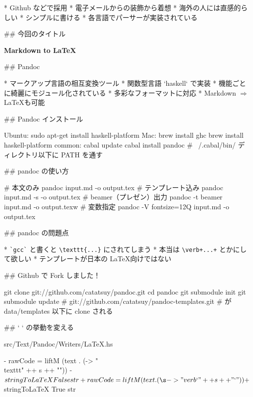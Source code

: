 * Github などで採用
* 電子メールからの装飾から着想
    * 海外の人には直感的らしい
* シンプルに書ける
* 各言語でパーサーが実装されている

## 今回のタイトル

\vspace{-25pt}
\begin{center}
 \Huge\bfseries
 Markdown to \LaTeX
\end{center}

## Pandoc

* マークアップ言語の相互変換ツール
* 関数型言語 `haskell` で実装
* 機能ごとに綺麗にモジュール化されている
* 多彩なフォーマットに対応
* Markdown $\Rightarrow$ \LaTeX も可能

## Pandoc インストール

\small

    Ubuntu:
      sudo apt-get install haskell-platform
    Mac:
      brew install ghc
      brew install haskell-platform
    common:
      cabal update
      cabal install pandoc
    # ~/.cabal/bin/ ディレクトリ以下に PATH を通す


## pandoc の使い方

\small

    # 本文のみ
    pandoc input.md -o output.tex
    # テンプレート込み
    pandoc input.md -s -o output.tex
    # beamer（プレゼン）出力
    pandoc -t beamer input.md -o output.texw
    # 変数指定
    pandoc -V fontsize=12Q input.md -o output.tex

## pandoc の問題点

* \verb/`gcc`/ と書くと \verb/\texttt{...}/ にされてしまう
* 本当は \verb/\verb+...+/ とかにして欲しい
* テンプレートが日本の \LaTeX 向けではない


## Github で Fork しました！

\small

    git clone git://github.com/catatsuy/pandoc.git
    cd pandoc
    git submodule init
    git submodule update
    # git://github.com/catatsuy/pandoc-templates.git
    # が data/templates 以下に clone される


## ` ` の挙動を変える

\small

    src/Text/Pandoc/Writers/LaTeX.hs

\footnotesize

    - rawCode = liftM (text . (\s -> "\\texttt{" ++ s ++ "}"))
    -                  $ stringToLaTeX False str
    + rawCode = liftM (text . (\s -> "\\verb`" ++ s ++ "`"))
    +                  $ stringToLaTeX True str


